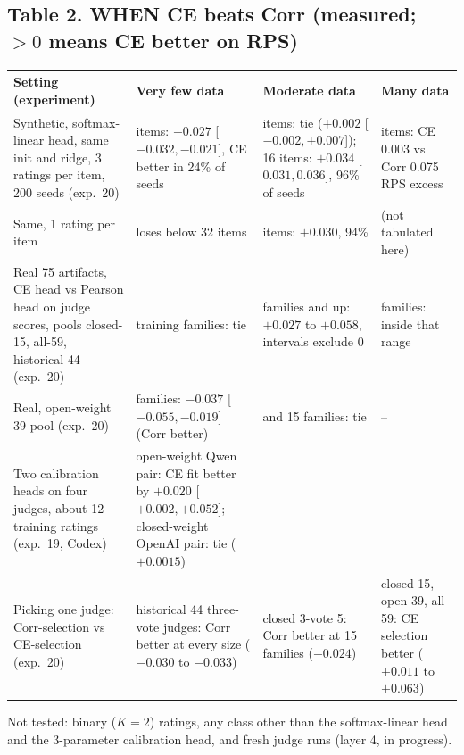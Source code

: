 \documentclass[11pt]{article}
\begin{document}
\subsection*{Table 2. WHEN CE beats Corr (measured; $>0$ means CE better on RPS)}
{\small\renewcommand{\arraystretch}{1.2}\setlength{\tabcolsep}{4pt}
\begin{longtable}{@{}>{\raggedright\arraybackslash}p{3.6cm}>{\raggedright\arraybackslash}p{4.3cm}>{\raggedright\arraybackslash}p{4.3cm}>{\raggedright\arraybackslash}p{3.7cm}@{}}
\toprule
Setting (experiment) & Very few data & Moderate data & Many data\\
\midrule
Synthetic, softmax-linear head, same init and ridge, 3 ratings per item, 200 seeds (exp.\ 20) & 4 items: $-0.027$ [$-0.032,-0.021$], CE better in 24\% of seeds & 8 items: tie ($+0.002$ [$-0.002,+0.007$]); 16 items: $+0.034$ [$0.031,0.036$], 96\% of seeds & 512 items: CE 0.003 vs Corr 0.075 RPS excess\\
Same, 1 rating per item & loses below 32 items & 32 items: $+0.030$, 94\% & (not tabulated here)\\
Real 75 artifacts, CE head vs Pearson head on judge scores, pools closed-15, all-59, historical-44 (exp.\ 20) & 3 training families: tie & 7 families and up: $+0.027$ to $+0.058$, intervals exclude 0 & 15 families: inside that range\\
Real, open-weight 39 pool (exp.\ 20) & 3 families: $-0.037$ [$-0.055,-0.019$] (Corr better) & 7 and 15 families: tie & --\\
Two calibration heads on four judges, about 12 training ratings (exp.\ 19, Codex) & open-weight Qwen pair: CE fit better by $+0.020$ [$+0.002,+0.052$]; closed-weight OpenAI pair: tie ($+0.0015$) & -- & --\\
Picking one judge: Corr-selection vs CE-selection (exp.\ 20) & historical 44 three-vote judges: Corr better at every size ($-0.030$ to $-0.033$) & closed 3-vote 5: Corr better at 15 families ($-0.024$) & closed-15, open-39, all-59: CE selection better ($+0.011$ to $+0.063$)\\
\bottomrule
\end{longtable}}
Not tested: binary ($K=2$) ratings, any class other than the softmax-linear head and the 3-parameter calibration head, and fresh judge runs (layer 4, in progress).
\end{document}
